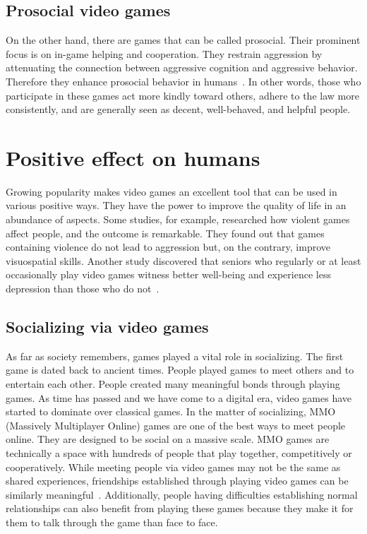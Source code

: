 \documentclass[10pt,twoside,english,a4paper]{article}
\begin{document}
\subsection{Prosocial video games} \label{prosocial}
On the other hand, there are games that can be called prosocial. Their prominent focus is on in-game helping and cooperation. They restrain aggression by attenuating the connection between aggressive cognition and aggressive behavior. Therefore they enhance prosocial behavior in humans~\cite{empathy}. In other words, those who participate in these games act more kindly toward others, adhere to the law more consistently, and are generally seen as decent, well-behaved, and helpful people.

\section{Positive effect on humans} \label{pozitive}
Growing popularity makes video games an excellent tool that can be used in various positive ways. They have the power to improve the quality of life in an abundance of aspects. Some studies, for example, researched how violent games affect people, and the outcome is remarkable. They found out that games containing violence do not lead to aggression but, on the contrary, improve visuospatial skills. Another study discovered that seniors who regularly or at least occasionally play video games witness better well-being and experience less depression than those who do not~\cite{poz-neg-sol}.

\subsection{Socializing via video games} \label{socializing}
As far as society remembers, games played a vital role in socializing. The first game is dated back to ancient times. People played games to meet others and to entertain each other. People created many meaningful bonds through playing games. As time has passed and we have come to a digital era, video games have started to dominate over classical games. In the matter of socializing, MMO (Massively Multiplayer Online) games are one of the best ways to meet people online. They are designed to be social on a massive scale. MMO games are technically a space with hundreds of people that play together, competitively or cooperatively. While meeting people via video games may not be the same as shared experiences, friendships established through playing video games can be similarly meaningful~\cite{poz-neg-sol}. Additionally, people having difficulties establishing normal relationships can also benefit from playing these games because they make it for them to talk through the game than face to face.
\end{document}
